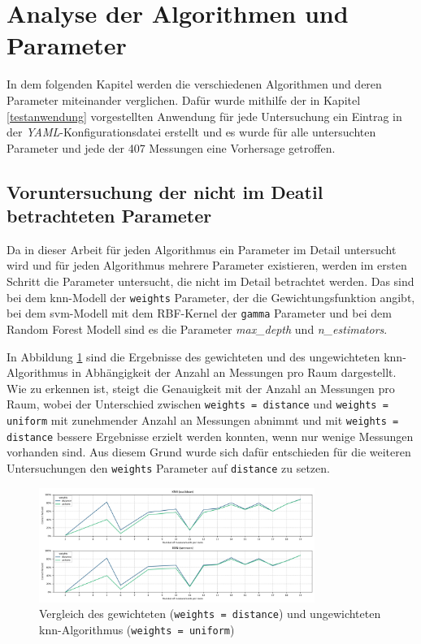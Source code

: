 \section{Analyse der Algorithmen und Parameter} \label{untersuchungen}

In dem folgenden Kapitel werden die verschiedenen Algorithmen und deren Parameter miteinander verglichen. Dafür wurde mithilfe der in Kapitel \ref{testanwendung} vorgestellten Anwendung für jede Untersuchung ein Eintrag in der \textit{YAML}-Konfigurationsdatei erstellt und es wurde für alle untersuchten Parameter und jede der 407 Messungen eine Vorhersage getroffen. 

\subsection{Voruntersuchung der nicht im Deatil betrachteten Parameter}

Da in dieser Arbeit für jeden Algorithmus ein Parameter im Detail untersucht wird und für jeden Algorithmus mehrere Parameter existieren, werden im ersten Schritt die Parameter untersucht, die nicht im Detail betrachtet werden. Das sind bei dem \gls{knn}-Modell der \texttt{weights} Parameter, der die Gewichtungsfunktion angibt, bei dem \gls{svm}-Modell mit dem RBF-Kernel der \texttt{gamma} Parameter und bei dem Random Forest Modell sind es die Parameter \textit{max\_depth} und \textit{n\_estimators}.

In Abbildung \ref{fig:1_distance_uniform_weights_01} sind die Ergebnisse des gewichteten und des ungewichteten \gls{knn}-Algorithmus in Abhängigkeit der Anzahl an Messungen pro Raum dargestellt. Wie zu erkennen ist, steigt die Genauigkeit mit der Anzahl an Messungen pro Raum, wobei der Unterschied zwischen \texttt{weights = distance} und \texttt{weights = uniform} mit zunehmender Anzahl an Messungen abnimmt und mit \texttt{weights = distance} bessere Ergebnisse erzielt werden konnten, wenn nur wenige Messungen vorhanden sind. Aus diesem Grund wurde sich dafür entschieden für die weiteren Untersuchungen den \texttt{weights} Parameter auf \texttt{distance} zu setzen.

\begin{figure}[H]
    \centering
    \includegraphics[width=0.8\textwidth]{images/01_knn_weights_01.png}
    \caption{Vergleich des gewichteten (\texttt{weights = distance}) und ungewichteten \gls{knn}-Algorithmus (\texttt{weights = uniform})}
    \label{fig:1_distance_uniform_weights_01}
\end{figure}


